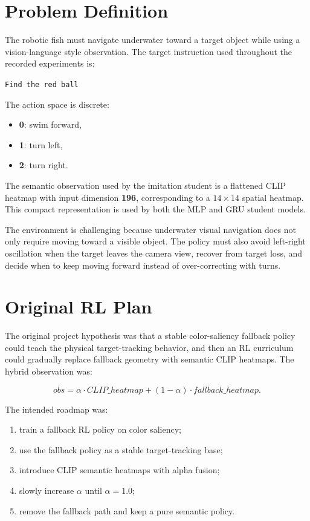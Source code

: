 \documentclass[11pt]{article}
\begin{document}
\section{Problem Definition}

The robotic fish must navigate underwater toward a target object while using a
vision-language style observation. The target instruction used throughout the
recorded experiments is:

\begin{center}
\texttt{Find the red ball}
\end{center}

The action space is discrete:

\begin{itemize}
  \item \textbf{0}: swim forward,
  \item \textbf{1}: turn left,
  \item \textbf{2}: turn right.
\end{itemize}

The semantic observation used by the imitation student is a flattened CLIP
heatmap with input dimension \textbf{196}, corresponding to a \(14 \times 14\)
spatial heatmap. This compact representation is used by both the MLP and GRU
student models.

The environment is challenging because underwater visual navigation does not
only require moving toward a visible object. The policy must also avoid
left-right oscillation when the target leaves the camera view, recover from
target loss, and decide when to keep moving forward instead of over-correcting
with turns.

\section{Original RL Plan}

The original project hypothesis was that a stable color-saliency fallback
policy could teach the physical target-tracking behavior, and then an RL
curriculum could gradually replace fallback geometry with semantic CLIP
heatmaps. The hybrid observation was:

\[
  obs = \alpha \cdot CLIP\_heatmap + (1 - \alpha) \cdot fallback\_heatmap.
\]

The intended roadmap was:

\begin{enumerate}
  \item train a fallback RL policy on color saliency;
  \item use the fallback policy as a stable target-tracking base;
  \item introduce CLIP semantic heatmaps with alpha fusion;
  \item slowly increase \(\alpha\) until \(\alpha = 1.0\);
  \item remove the fallback path and keep a pure semantic policy.
\end{enumerate}
\end{document}
